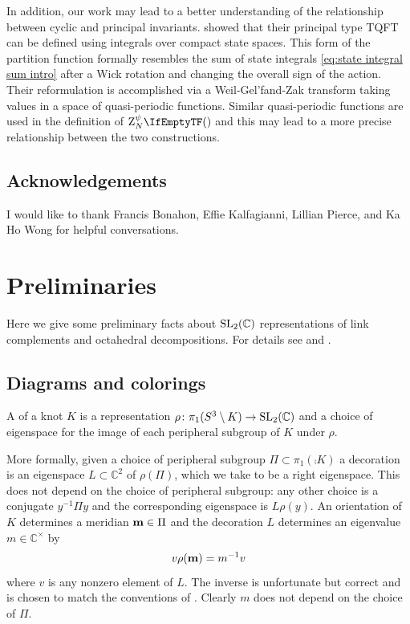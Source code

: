 \documentclass[margincite, leqno]{sl2art}
\numberwithin{equation}{section}
\begin{document}
In addition, our work may lead to a better understanding of the
relationship between cyclic and principal invariants.
\textcite{arXiv:1305.4291} showed that their principal type TQFT can
be defined using integrals over compact state spaces.
This form of the partition function formally resembles the sum of
state integrals \eqref{eq:state integral sum intro} after a Wick
rotation and changing the overall sign of the action.
Their reformulation is accomplished via a Weil-Gel'fand-Zak transform
taking values in a space of quasi-periodic functions.
Similar quasi-periodic functions are used in the definition of
\(\qinv{}\) \cite{McPhailSnyderVolume} and this may lead to a more
precise relationship between the two constructions.

\subsection*{Acknowledgements}
I would like to thank Francis Bonahon, Effie Kalfagianni, Lillian
Pierce, and Ka Ho Wong for helpful conversations.

\section{Preliminaries}%
\label{sec:Preliminaries}

Here we give some preliminary facts about \(\operatorname{SL}_2(\mathbb{C})\) representations of
link complements and octahedral decompositions.
For details see
\cite{McphailSnyder2022hyperbolicstructureslinkcomplements} and
\cite{McphailSnyder2024octahedralcoordinateswirtingerpresentation}.
\subsection{Diagrams and colorings}%
\label{sub:Diagrams}

\begin{definition}
  A  of a knot \(K\) is a
  representation \(\rho \colon \pi_{1}(S^3 \setminus K) \to \operatorname{SL}_2(\mathbb{C})\) and a choice
  of eigenspace for the image of each peripheral subgroup of \(K\)
  under \(\rho\).
\end{definition}

More formally, given a choice of peripheral subgroup \(\Pi \subset
\pi_{1}(\comp{K})\) a decoration is an eigenspace \(L \subset
\mathbb{C}^{2}\) of \(\rho(\Pi)\), which we take to be a right eigenspace.
This does not depend on the choice of peripheral subgroup: any other
choice is a conjugate \(y^{-1} \Pi y\) and the corresponding
eigenspace is \(L \rho(y)\).
An orientation of \(K\) determines a meridian \(\mathbf{m} \in \Pi\) and
the decoration \(L\) determines an eigenvalue \(m \in \mathbb{C}^{\times}\) by
\[
  v \rho(\mathbf{m}) = m^{-1} v
\]
where \(v\) is any nonzero element of \(L\).
The inverse is unfortunate but correct and is chosen to match the
conventions of \cite{McPhailSnyderAlgebra,McPhailSnyderVolume}.
Clearly \(m\) does not depend on the choice of \(\Pi\).
\end{document}
